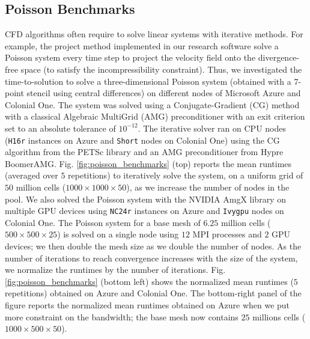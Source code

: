 \documentclass[10pt,journal,compsoc]{IEEEtran}
\begin{document}
\subsection{Poisson Benchmarks}\label{subsec:poisson_benchmarks}

CFD algorithms often require to solve linear systems with iterative methods.
For example, the project method implemented in our research software solve a Poisson system every time step to project the velocity field onto the divergence-free space (to satisfy the incompressibility constraint).
Thus, we investigated the time-to-solution to solve a three-dimensional Poisson system (obtained with a 7-point stencil using central differences) on different nodes of Microsoft Azure and Colonial One.
The system was solved using a Conjugate-Gradient (CG) method with a classical Algebraic MultiGrid (AMG) preconditioner with an exit criterion set to an absolute tolerance of $10^{-12}$.
The iterative solver ran on CPU nodes (\texttt{H16r} instances on Azure and \texttt{Short} nodes on Colonial One) using the CG algorithm from the PETSc library\cite{balay_et_al_2018} and an AMG preconditioner from Hypre BoomerAMG.
Fig. \ref{fig:poisson_benchmarks} (top) reports the mean runtimes (averaged over $5$ repetitions) to iteratively solve the system, on a uniform grid of $50$ million cells ($1000 \times 1000 \times 50$), as we increase the number of nodes in the pool.
We also solved the Poisson system with the NVIDIA AmgX library on multiple GPU devices using \texttt{NC24r} instances on Azure and \texttt{Ivygpu} nodes on Colonial One.
The Poisson system for a base mesh of $6.25$ million cells ($500 \times 500 \times 25$) is solved on a single node using $12$ MPI processes and $2$ GPU devices; we then double the mesh size as we double the number of nodes.
As the number of iterations to reach convergence increases with the size of the system, we normalize the runtimes by the number of iterations.
Fig. \ref{fig:poisson_benchmarks} (bottom left) shows the normalized mean runtimes ($5$ repetitions) obtained on Azure and Colonial One.
The bottom-right panel of the figure reports the normalized mean runtimes obtained on Azure when we put more constraint on the bandwidth; the base mesh now contains $25$ millions cells ($1000 \times 500 \times 50$).
\end{document}
